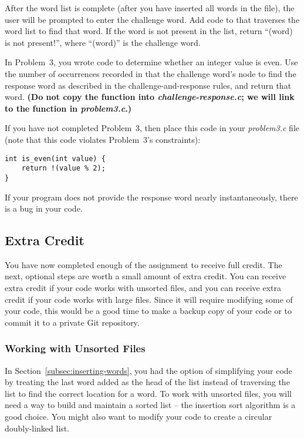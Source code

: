 

After the word list is complete (after you have inserted all words in the file), the user will be prompted to enter the challenge word.
Add code to  that traverses the word list to find that word.
If the word is not present in the list, return ``(word) is not present!'', where ``(word)'' is the challenge word.

In Problem~3, you wrote code to determine whether an integer value is even.
Use the number of occurrences recorded in that the challenge word's node to find the response word as described in the challenge-and-response rules, and return that word.
\textbf{(Do not copy the  function into \textit{challenge-response.c};
we will link to the function in \textit{problem3.c}.)}

If you have not completed Problem~3, then place this code in your \textit{problem3.c} file
(note that this code violates Problem~3's constraints):

\begin{lstlisting}
int is_even(int value) {
    return !(value % 2);
}
\end{lstlisting}

If your program does not provide the response word nearly instantaneously, there is a bug in your code.

\subsection{Extra Credit}

You have now completed enough of the assignment to receive full credit.
The next, optional steps are worth a small amount of extra credit.
You can receive extra credit if your code works with unsorted files, and you can receive extra credit if your code works with large files.
Since it will require modifying some of your code, this would be a good time to make a backup copy of your code or to commit it to a private Git repository.

\subsubsection*{Working with Unsorted Files}

In Section~\ref{subsec:inserting-words}, you had the option of simplifying your code by treating the last word added as the head of the list instead of traversing the list to find the correct location for a word.
To work with unsorted files, you will need a way to build and maintain a sorted list -- the insertion sort algorithm is a good choice.
You might also want to modify your code to create a circular doubly-linked list.

